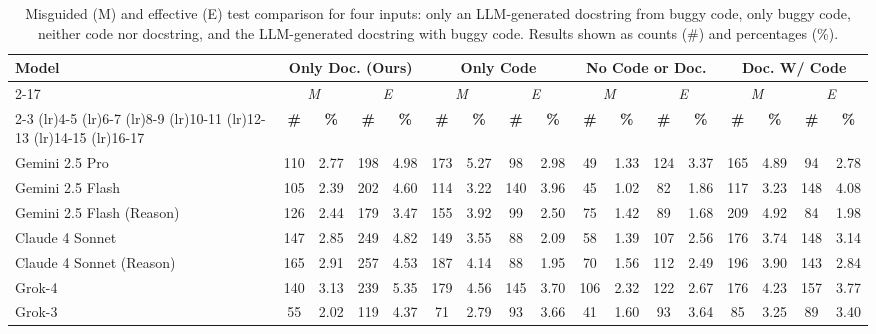 \documentclass[acmsmall]{acmart}
\begin{document}
\begin{table}[htbp!]
\centering
\tiny
\setlength{\tabcolsep}{2.5pt}
\caption{Misguided (M) and effective (E) test comparison for four inputs: only an LLM-generated docstring from buggy code, only buggy code, neither code nor docstring, and the LLM-generated docstring with buggy code. Results shown as counts (\#) and percentages (\%).}
\label{tab:docstring_improve}
\begin{tabular}{l|cc|cc|cc|cc|cc|cc|cc|cc}
\toprule
\multirow{4}{*}{\textbf{Model}} & \multicolumn{4}{c|}{\textbf{Only Doc. (Ours)}} & \multicolumn{4}{c|}{\textbf{Only Code}} & \multicolumn{4}{c|}{\textbf{No Code or Doc.}} & \multicolumn{4}{c}{\textbf{Doc. W/ Code}} \\
\cmidrule{2-17}
& \multicolumn{2}{c|}{\emph{M}} & \multicolumn{2}{c|}{\emph{E}} & \multicolumn{2}{c|}{\emph{M}} & \multicolumn{2}{c|}{\emph{E}} & \multicolumn{2}{c|}{\emph{M}} & \multicolumn{2}{c|}{\emph{E}} & \multicolumn{2}{c|}{\emph{M}} & \multicolumn{2}{c}{\emph{E}} \\
\cmidrule(lr){2-3} \cmidrule(lr){4-5} \cmidrule(lr){6-7} \cmidrule(lr){8-9} \cmidrule(lr){10-11} \cmidrule(lr){12-13} \cmidrule(lr){14-15} \cmidrule(lr){16-17}
& \textbf{\#} & \textbf{\%} & \textbf{\#} & \textbf{\%} & \textbf{\#} & \textbf{\%} & \textbf{\#} & \textbf{\%} & \textbf{\#} & \textbf{\%} & \textbf{\#} & \textbf{\%} & \textbf{\#} & \textbf{\%} & \textbf{\#} & \textbf{\%} \\
\midrule
Gemini 2.5 Pro & 110 & 2.77 & 198 & 4.98 & 173 & 5.27 & 98 & 2.98 & 49 & 1.33 & 124 & 3.37 & 165 & 4.89 & 94 & 2.78 \\
Gemini 2.5 Flash & 105 & 2.39 & 202 & 4.60 & 114 & 3.22 & 140 & 3.96 & 45 & 1.02 & 82 & 1.86 & 117 & 3.23 & 148 & 4.08 \\
Gemini 2.5 Flash (Reason) & 126 & 2.44 & 179 & 3.47 & 155 & 3.92 & 99 & 2.50 & 75 & 1.42 & 89 & 1.68 & 209 & 4.92 & 84 & 1.98 \\
Claude 4 Sonnet & 147 & 2.85 & 249 & 4.82 & 149 & 3.55 & 88 & 2.09 & 58 & 1.39 & 107 & 2.56 & 176 & 3.74 & 148 & 3.14 \\
Claude 4 Sonnet (Reason) & 165 & 2.91 & 257 & 4.53 & 187 & 4.14 & 88 & 1.95 & 70 & 1.56 & 112 & 2.49 & 196 & 3.90 & 143 & 2.84 \\
Grok-4 & 140 & 3.13 & 239 & 5.35 & 179 & 4.56 & 145 & 3.70 & 106 & 2.32 & 122 & 2.67 & 176 & 4.23 & 157 & 3.77 \\
Grok-3 & 55 & 2.02 & 119 & 4.37 & 71 & 2.79 & 93 & 3.66 & 41 & 1.60 & 93 & 3.64 & 85 & 3.25 & 89 & 3.40 \\

\end{tabular}
\end{table}
\end{document}
